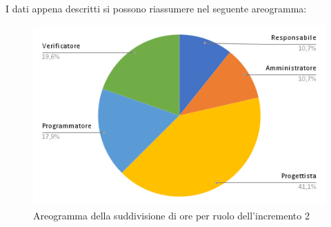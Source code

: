\pagebreak
I dati appena descritti si possono riassumere nel seguente areogramma:
\begin{figure}[!h]
    \vspace{5px}
    \includegraphics[scale=0.5]{../../../Images/Diagrammi/Diagramma a torta/areogrammaIncremento7.png}
    \centering
    \caption{Areogramma della suddivisione di ore per ruolo dell'incremento 2}
\end{figure}

